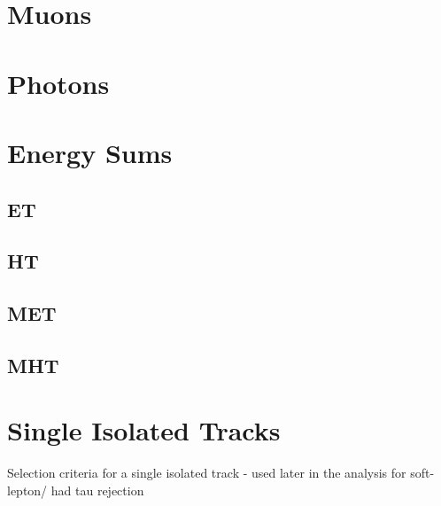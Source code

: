 \alphat


\section{Muons}  %
\label{sec:objects_muons}


\section{Photons}  %
\label{sec:objects_photons}


\section{Energy Sums}  %
\label{sec:objects_energy_sums}

\subsection{ET}
\subsection{HT}
\subsection{MET}
\subsection{MHT}

\section{Single Isolated Tracks}  %
\label{sec:objects_sit}
Selection criteria for a single isolated track - used later in the analysis for soft-lepton/
had tau rejection